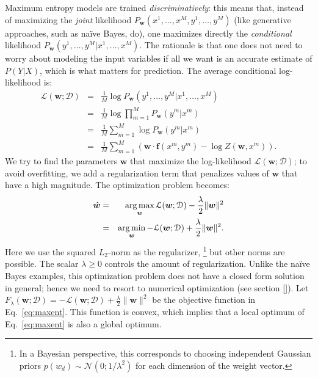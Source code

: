 Maximum entropy models are trained \emph{discriminatively}: this means that, instead of maximizing the \emph{joint} likelihood 
$P_{\boldsymbol{w}}(x^1,\ldots,x^M,y^1,\ldots,y^M)$ (like generative approaches, such as na\"ive Bayes, do), one maximizes directly 
the \emph{conditional} likelihood $P_{\boldsymbol{w}}(y^1,\ldots,y^M | x^1,\ldots,x^M)$. 
The rationale is that one does not need to worry about modeling the input variables if all we want is an 
accurate estimate of $P(Y|X)$, which is what matters for prediction. 
The average conditional log-likelihood is: 
\begin{eqnarray}
\mathcal{L}(\boldsymbol{w}; \mathcal{D}) &=& 
\frac{1}{M}\log P_{\boldsymbol{w}}(y^1,\ldots,y^M | x^1,\ldots,x^M) \nonumber\\
&=& \frac{1}{M}\log \prod_{m=1}^M P_{\boldsymbol{w}}(y^m | x^m)\nonumber\\
&=&  \frac{1}{M}\sum_{m=1}^M \log P_{\boldsymbol{w}}(y^m | x^m)\nonumber\\
&=&  \frac{1}{M}\sum_{m=1}^M \left( \boldsymbol{w} \cdot \boldsymbol{f}(x^m,y^m) 
- \log Z(\boldsymbol{w},x^m)\right). 
\end{eqnarray}
We try to find the parameters $\boldsymbol{w}$ that maximize the log-likelihood 
$\mathcal{L}(\boldsymbol{w}; \mathcal{D})$; to avoid overfitting, 
we add a
regularization term that penalizes values of $\boldsymbol{w}$ that have a high
magnitude. The optimization problem becomes:
\begin{eqnarray}\label{eq:maxent} 
\hat{\boldsymbol{w}} &=& 
\operatorname*{arg\,max}_{\boldsymbol{w}} \mathcal{L}(\boldsymbol{w}; \mathcal{D})  - \frac{\lambda}{2} \|\boldsymbol{w}\|^2 \nonumber\\
&=& 
\operatorname*{arg\,min}_{\boldsymbol{w}} -\mathcal{L}(\boldsymbol{w}; \mathcal{D}) + \frac{\lambda}{2} \|\boldsymbol{w}\|^2.
\end{eqnarray} 
Here we use the squared $L_2$-norm as the regularizer,%
\footnote{In a Bayesian perspective, this corresponds to choosing independent Gaussian priors 
$p(w_d) \sim \mathcal{N}(0; 1/\lambda^2)$ for each dimension of the weight vector.} %
but other norms are possible. The scalar $\lambda \ge 0$ controls the amount of regularization. 
Unlike the na\"ive Bayes examples, this optimization problem does not have a closed form solution in general; hence we need to resort to 
numerical optimization (see section \ref{}). 
Let $F_{\lambda}(\boldsymbol{w}; \mathcal{D}) = -\mathcal{L}(\boldsymbol{w}; \mathcal{D}) + \frac{\lambda}{2} \|\boldsymbol{w}\|^2$ 
be the objective function in Eq.~\ref{eq:maxent}.  This function is convex, which implies that a local optimum of Eq.~\ref{eq:maxent} is also a global optimum. 
